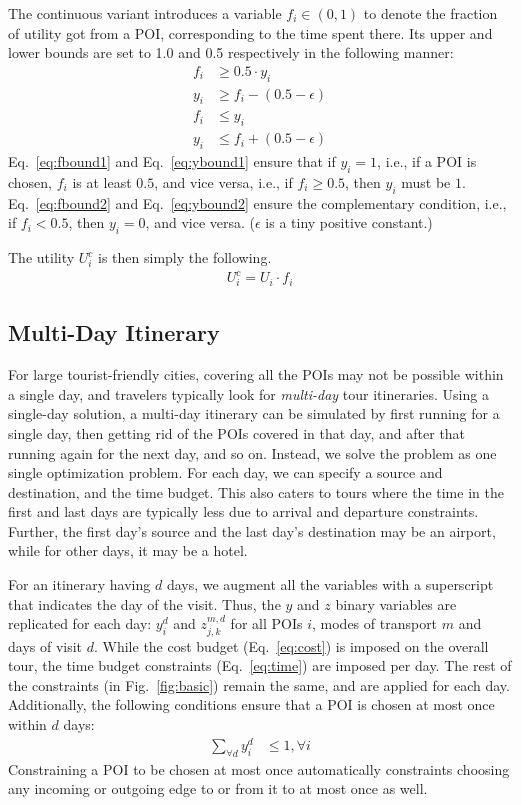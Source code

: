 The continuous variant introduces a variable $f_i \in (0,1)$ to denote the fraction of utility got from a POI, corresponding to the time spent there.
Its upper and lower bounds are set to 1.0 and 0.5 respectively in the following manner:
%
\begin{align}
	\label{eq:fbound1}
	f_i & \geq 0.5 \cdot y_i \\
	\label{eq:ybound1}
	y_i & \geq f_i - (0.5 - \epsilon) \\
    \label{eq:fbound2}
	f_i & \leq y_i \\
	\label{eq:ybound2}
    y_i & \leq f_i + (0.5 - \epsilon)
\end{align}
%
Eq.~\eqref{eq:fbound1} and Eq.~\eqref{eq:ybound1} ensure that if $y_i = 1$, i.e., if a POI is chosen, $f_i$ is at least $0.5$, and vice versa, i.e., if $f_i \geq 0.5$, then $y_i$ must be $1$. Eq.~\eqref{eq:fbound2} and
Eq.~\eqref{eq:ybound2} ensure the complementary condition, i.e., if $f_i
< 0.5$, then $y_i = 0$, and vice versa.  ($\epsilon$ is a
tiny positive constant.)

The utility $U^c_i$ is then simply the following.
%
\begin{align}
	\label{eq:continuous}
	U^c_i = U_i \cdot f_i
\end{align}

\subsection{Multi-Day Itinerary}
\label{sec:multiday}

For large tourist-friendly cities, covering all the POIs may not be
possible within a single day, and travelers typically look for
\emph{multi-day} tour itineraries.
Using a single-day solution, a multi-day itinerary can be simulated
by first
running for a single day, then getting rid of the POIs covered in that day, and
after that running again for the next day, and so on.
Instead, we solve the
problem as one single optimization problem.  For each day, we can specify a
source and destination, and the time budget.  This also caters to tours where
the time in the first and last days are typically less due to arrival and
departure constraints.  Further, the first day's source and the last day's
destination may be an airport, while for other days, it
may be a hotel.

For an itinerary having $d$ days, we augment all the variables with a
superscript that indicates the day of the visit.  Thus, the $y$ and $z$
binary variables are replicated for each day: $y^d_i$ and $z^{m,d}_{j,k}$
for all POIs $i$, modes of transport $m$ and days of visit $d$.  While the
cost budget (Eq.~\eqref{eq:cost}) is imposed on the overall tour, the time
budget constraints (Eq.~\eqref{eq:time}) are imposed per day.  The rest of
the constraints (in Fig.~\ref{fig:basic})
remain the same, and are applied for each day.  Additionally, the following
conditions ensure that a POI is chosen at most once within $d$ days:
%
\begin{align}
	\label{eq:multiday}
	\sum_{\forall d} y^d_i & \leq 1, \forall i
\end{align}
%
Constraining a POI to be chosen at most once automatically constraints choosing any incoming
or outgoing edge to or from it to at most once as well.

